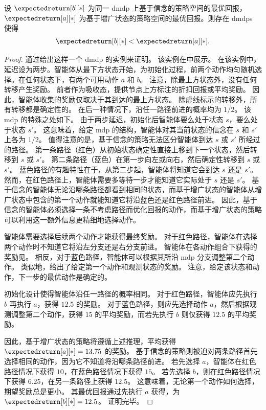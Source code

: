 \begin{prop}
\label{pp:counter_example_belief_based}
    设 $\expectedreturn[b][*]$ 为同一 \gls{dmdp} 上基于信念的策略空间的最优回报，$\expectedreturn[a][*]$ 为基于增广状态的策略空间的最优回报。则存在 \glspl{dmdp} 使得
    \begin{align*}
        \expectedreturn[b][*]<\expectedreturn[a][*].
    \end{align*}
\end{prop}
\begin{proof}
    通过给出这样一个 \gls{dmdp} 的实例来证明。
    该实例在中展示。
    在该实例中，延迟设为两步。智能体从最下方状态开始，为初始化过程，前两个动作均匀随机选择。在任何状态下，有两个可用动作 $a$ 和 $b$。
    注意，除最上方状态外，没有任何转移产生奖励。
    前者作为吸收态，提供节点上方标注的折扣回报或平均奖励。
    因此，智能体收集的奖励仅取决于其到达的最上方状态。
    除虚线标示的转移外，所有转移都是确定性的。
    在后一种情况下，沿任一路径前进的概率均为 $1/2$。
    该 \gls{mdp} 的特殊之处如下。
    由于两步延迟，初始化后智能体要么处于状态 $s$，要么处于状态 $s'$。
    这意味着，给定 \gls{mdp} 的结构，智能体对其当前状态的信念在 $s$ 和 $s'$ 上各为 $1/2$。
    值得注意的是，基于信念的策略无法区分智能体到达 $s$ 或 $s'$ 所经过的路径。
    第一条路径（红色）从初始状态确定性直接上移到下一个状态，然后转移到 $s$ 或 $s'$。
    第二条路径（蓝色）在第一步向左或向右，然后确定性转移到 $s$ 或 $s'$。
    蓝色路径的有趣特性在于，从第二步起，智能体将知道它会到达 $s$ 还是 $s'$。
    然而，在红色路径上，智能体需要多等待一步才能知道它实际处于 $s$ 还是 $s'$。
    基于信念的智能体无论沿哪条路径都看到相同的状态，而基于增广状态的智能体从增广状态中包含的第一个动作就能知道它将沿蓝色还是红色路径前进。
    因此，基于信念的智能体必须选择一条不考虑路径而优化回报的动作，而基于增广状态的策略可以利用这一额外信息更精细地选择动作。

    智能体需要选择后续两个动作才能获得最终奖励。
    对于红色路径，智能体在选择两个动作时不知道它将沿左分支还是右分支前进。
    智能体在各动作组合下获得的奖励见。
    相反，对于蓝色路径，智能体可以根据其所沿 \gls{mdp} 分支调整第二个动作。
    类似地，给出了给定第一个动作和观测状态的奖励。
    注意，给定该状态和动作，下一步的最优动作是确定的。

    初始化设计使得智能体沿任一路径的概率相同。
    对于红色路径，智能体应先执行 $b$ 再执行 $a$，获得 $12.5$ 的奖励。
    对于蓝色路径，则应先选择动作 $a$，然后根据观测调整第二个动作，获得 $15$ 的平均奖励，而若先执行 $b$ 则仅获得 $12.5$ 的平均奖励。

    因此，基于增广状态的策略将遵循上述推理，平均获得 $\expectedreturn[a][*]=13.75$ 的奖励。
    基于信念的策略则被迫对两条路径首先选择相同的动作，因为它不知道将沿哪条路径前进。
    若先选择 $a$，智能体在红色路径情况下获得 $10$，在蓝色路径情况下获得 $15$。
    若先选择 $b$，则在红色路径情况下获得 $6.25$，在另一条路径上获得 $12.5$。
    这意味着，无论第一个动作如何选择，期望奖励总是更小。
    其最优回报通过先执行 $a$ 获得，为 $\expectedreturn[b][*]=12.5$。
    证明完毕。
\end{proof}


